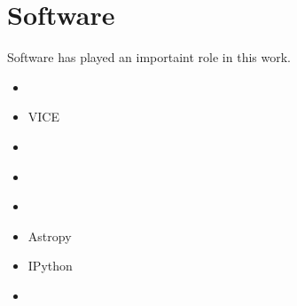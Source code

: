 \documentclass[12pt,oneside]{report}
\begin{document}
\section{Software}
Software has played an importaint role in this work. 
\begin{itemize}
    \item \citep{OhioSupercomputerCenter1987}
    \item VICE \citet{JW20} \citet{james+21}
    \item \cite{matplotlib}
    \item \citet{numpy}
    \item \citet{pandas}
    \item Astropy \citep{astropy:2013, astropy:2018, astropy:2022}
    \item IPython \citep{ipy}
    \item \citep{scipy}
\end{itemize}
\end{document}
